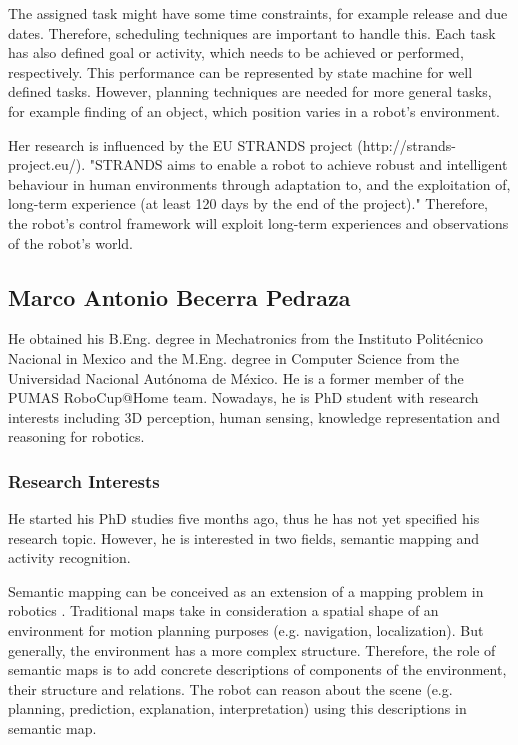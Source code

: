 \documentclass[conference]{IEEEtran}
\begin{document}
The assigned task might have some time constraints, for example release and due dates. Therefore, scheduling techniques are important to handle this. Each task has also defined goal or activity, which needs to be achieved or performed, respectively. This performance can be represented by state machine for well defined tasks. However, planning techniques are needed for more general tasks, for example finding of an object, which position varies  in a robot's environment.

Her research is influenced by the EU STRANDS project (http://strands-project.eu/). "STRANDS aims to enable a robot to achieve robust and intelligent behaviour in human environments through adaptation to, and the exploitation of, long-term experience (at least 120 days by the end of the project)." %
Therefore, the robot's control framework will exploit long-term experiences and observations of the robot's world. 

\subsection{Marco Antonio Becerra Pedraza}

He obtained his B.Eng. degree in Mechatronics from the Instituto Politécnico Nacional in Mexico and the M.Eng. degree in Computer Science from the Universidad Nacional Autónoma de México. He is a former member of the PUMAS RoboCup@Home team. Nowadays, he is PhD student with research interests including 3D perception, human sensing, knowledge representation and reasoning for robotics.

\subsubsection*{Research Interests}

He started his PhD studies five months ago, thus he has not yet specified his research topic. However, he is interested in two fields, semantic mapping and activity recognition.

Semantic mapping can be conceived as an extension of a mapping problem in robotics \cite{Nuchter08_TowardsSemanticMaps}. Traditional maps take in consideration a spatial shape of an environment for motion planning purposes (e.g. navigation, localization). But generally, the environment has a more complex structure. Therefore, the role of semantic maps is to add concrete descriptions of components of the environment, their structure and relations. The robot can reason about the scene (e.g. planning, prediction, explanation, interpretation) using this descriptions in semantic map.
\end{document}
